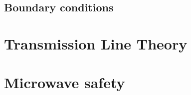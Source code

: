 \subsection{Boundary conditions}

\section{Transmission Line Theory}

\section{Microwave safety}
\parencite[sec.5.8.3]{Benford2015}



